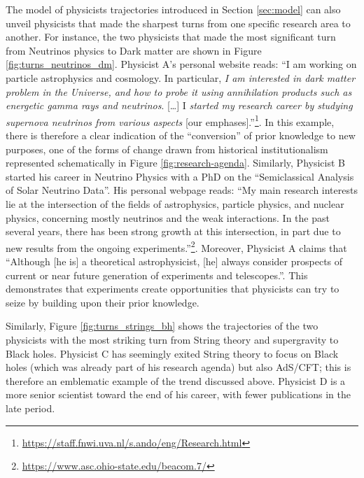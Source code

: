 \documentclass{article}
\begin{document}
\fontsize{6}{7}\selectfont\normalsize
\fontsize{6}{7}\selectfont\normalsize

The model of physicists trajectories introduced in Section \ref{sec:model} can also unveil physicists that made the sharpest turns from one specific research area to another. For instance, the two physicists that made the most significant turn from Neutrinos physics to Dark matter are shown in Figure \ref{fig:turns_neutrinos_dm}. Physicist A's personal website reads: ``I am working on particle astrophysics and cosmology. In particular, \textit{I am interested in dark matter problem in the Universe, and how to probe it using annihilation products such as energetic gamma rays and neutrinos}. [\dots]  I \textit{started my research career by studying supernova neutrinos from various aspects} [our emphases].''\footnote{\url{https://staff.fnwi.uva.nl/s.ando/eng/Research.html}}. In this example, there is therefore a clear indication of the ``conversion'' of prior knowledge to new purposes, one of the forms of change drawn from historical institutionalism represented schematically in Figure \ref{fig:research-agenda}. Similarly, Physicist B started his career in Neutrino Physics with a PhD on the ``Semiclassical Analysis of Solar Neutrino Data''.  His personal webpage reads: ``My main research interests lie at the intersection of the fields of astrophysics, particle physics, and nuclear physics, concerning mostly neutrinos and the weak interactions. In the past several years, there has been strong growth at this intersection, in part due to new results from the ongoing experiments.''\footnote{\url{https://www.asc.ohio-state.edu/beacom.7/}}. Moreover, Physicist A claims that ``Although [he is] a theoretical astrophysicist, [he] always consider prospects of current or near future generation of experiments and telescopes.''. This demonstrates that experiments create opportunities that physicists can try to seize by building upon their prior knowledge.

Similarly, Figure \ref{fig:turns_strings_bh} shows the trajectories of the two physicists with the most striking turn from String theory and supergravity to Black holes. Physicist C has seemingly exited String theory to focus on Black holes (which was already part of his research agenda) but also AdS/CFT; this is therefore an emblematic example of the trend discussed above. Physicist D is a more senior scientist toward the end of his career, with fewer publications in the late period.
\end{document}
